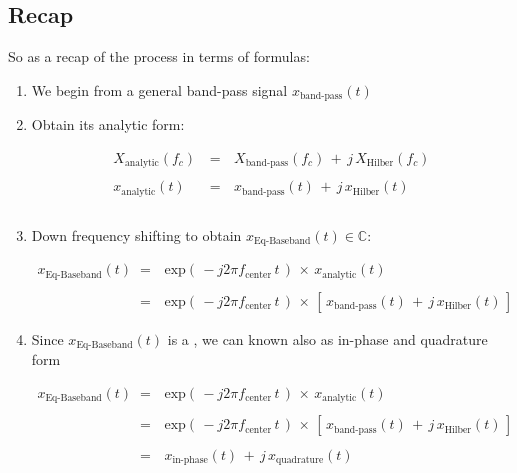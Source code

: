 \subsection{Recap}

So as a recap of the process in terms of formulas:

\begin{enumerate}

\item We begin from a general band-pass signal $x_{\text{band-pass}}(t)$

\item Obtain its analytic form:

\begin{equation}
\begin{array}{rcl}
X_{\text{analytic}}(f_c) \, &=& \, X_{\text{band-pass}}(f_c) \, + \, j \, X_{\text{Hilber}}(f_c) \\ \\
x_{\text{analytic}}(t) \, &=& \, x_{\text{band-pass}}(t) \, + \, j \, x_{\text{Hilber}}(t) \\ \\
\end{array}
\end{equation}

\item Down frequency shifting to obtain $x_{\text{Eq-Baseband}}(t) \in \mathbb{C}$:

\begin{equation}
\begin{array}{rcl}
x_{\text{Eq-Baseband}}(t) \, &=& \, \text{exp}\left(\, -j 2 \pi f_{\text{center}} \, t \,\right) \, \times \, x_{\text{analytic}}(t) \\ \\
	&=& \, \text{exp}\left(\, -j 2 \pi f_{\text{center}} \, t \,\right) \, \times \, \left[\,  x_{\text{band-pass}}(t) \, + \, j \, x_{\text{Hilber}}(t) \,\right]
\end{array}
\end{equation}

\item Since  $x_{\text{Eq-Baseband}}(t)$ is a , we can  known also as in-phase and quadrature form

\begin{equation}
\begin{array}{rcl}
x_{\text{Eq-Baseband}}(t) \, &=& \, \text{exp}\left(\, -j 2 \pi f_{\text{center}} \, t \,\right) \, \times \, x_{\text{analytic}}(t) \\ \\
	&=& \, \text{exp}\left(\, -j 2 \pi f_{\text{center}} \, t \,\right) \, \times \, \left[\,  x_{\text{band-pass}}(t) \, + \, j \, x_{\text{Hilber}}(t) \,\right] \\ \\
	&=& \, x_{\text{in-phase}}(t) \, + \, j \, x_{\text{quadrature}}(t)
\end{array}
\end{equation}


\end{enumerate}
